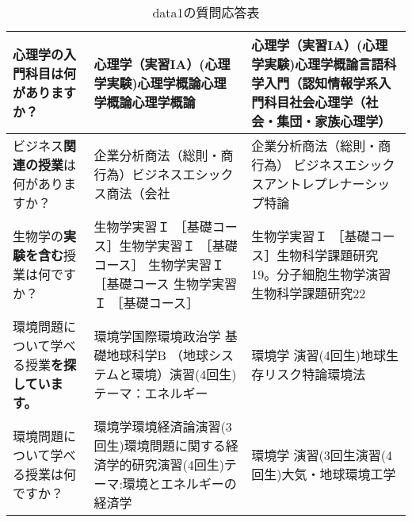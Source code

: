 \begin{table}[h!]
\begin{tabular}{|p{4cm}|p{6cm}|p{6cm}|}
        心理学\textbf{の入門科目}は何がありますか？ & 心理学（実習IA）(心理学実験)心理学概論心理学概論心理学概論 & 心理学（実習IA）(心理学実験)心理学概論言語科学入門（認知情報学系入門科目社会心理学（社会・集団・家族心理学） \\ \hline
        ビジネス\textbf{関連の授業}は何がありますか？ & 企業分析商法（総則・商行為）ビジネスエシックス商法（会社 & 企業分析商法（総則・商行為） ビジネスエシックスアントレプレナーシップ特論 \\ \hline
        生物学の\textbf{実験を含む}授業は何ですか？ & 生物学実習Ｉ ［基礎コース］生物学実習Ｉ ［基礎コース］ 生物学実習Ｉ ［基礎コース 生物学実習Ｉ ［基礎コース］ & 生物学実習Ｉ ［基礎コース］生物科学課題研究19。分子細胞生物学演習生物科学課題研究22 \\ \hline
        環境問題について学べる授業\textbf{を探しています。} & 環境学国際環境政治学 基礎地球科学B （地球システムと環境）演習(4回生)テーマ：エネルギー & 環境学 演習(4回生)地球生存リスク特論環境法 \\ \hline
        環境問題について学べる授業は何ですか？ & 環境学環境経済論演習(3回生)環境問題に関する経済学的研究演習(4回生)テーマ:環境とエネルギーの経済学 & 環境学 演習(3回生演習(4回生)大気・地球環境工学 \\ \hline
    \end{tabular}
    \caption{data1の質問応答表}
\end{table}




